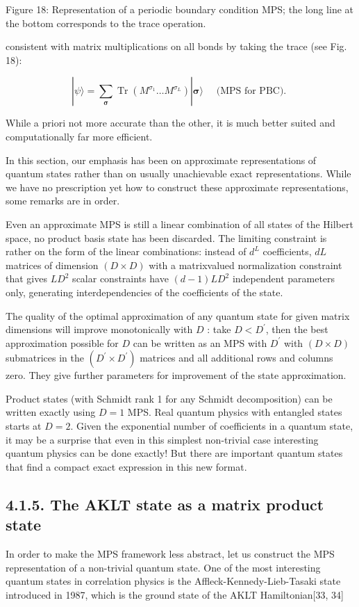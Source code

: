 \documentclass[12pt]{article}
\begin{document}
Figure 18: Representation of a periodic boundary condition MPS; the long line at the bottom corresponds to the trace operation.

consistent with matrix multiplications on all bonds by taking the trace (see Fig. 18):


\begin{equation*}
|\psi\rangle=\sum_{\boldsymbol{\sigma}} \operatorname{Tr}\left(M^{\sigma_{1}} \ldots M^{\sigma_{L}}\right)|\boldsymbol{\sigma}\rangle \quad \text { (MPS for PBC). } \tag{77}
\end{equation*}


While a priori not more accurate than the other, it is much better suited and computationally far more efficient.

In this section, our emphasis has been on approximate representations of quantum states rather than on usually unachievable exact representations. While we have no prescription yet how to construct these approximate representations, some remarks are in order.

Even an approximate MPS is still a linear combination of all states of the Hilbert space, no product basis state has been discarded. The limiting constraint is rather on the form of the linear combinations: instead of $d^{L}$ coefficients, $d L$ matrices of dimension $(D \times D)$ with a matrixvalued normalization constraint that gives $L D^{2}$ scalar constraints have $(d-1) L D^{2}$ independent parameters only, generating interdependencies of the coefficients of the state.

The quality of the optimal approximation of any quantum state for given matrix dimensions will improve monotonically with $D$ : take $D<D^{\prime}$, then the best approximation possible for $D$ can be written as an MPS with $D^{\prime}$ with $(D \times D)$ submatrices in the $\left(D^{\prime} \times D^{\prime}\right)$ matrices and all additional rows and columns zero. They give further parameters for improvement of the state approximation.

Product states (with Schmidt rank 1 for any Schmidt decomposition) can be written exactly using $D=1$ MPS. Real quantum physics with entangled states starts at $D=2$. Given the exponential number of coefficients in a quantum state, it may be a surprise that even in this simplest non-trivial case interesting quantum physics can be done exactly! But there are important quantum states that find a compact exact expression in this new format.

\subsection*{4.1.5. The AKLT state as a matrix product state}
In order to make the MPS framework less abstract, let us construct the MPS representation of a non-trivial quantum state. One of the most interesting quantum states in correlation physics is the Affleck-Kennedy-Lieb-Tasaki state introduced in 1987, which is the ground state of the AKLT Hamiltonian[33, 34]
\end{document}
